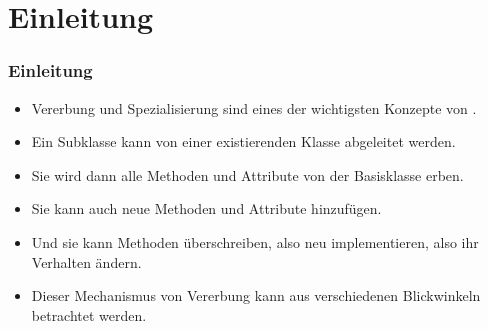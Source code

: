 \documentclass[aspectratio=169,mathserif,notheorems]{beamer}%
\subtitle{43.~Klassen:~Vererbung}%
\begin{document}
%
%
\startPresentation%
%
\section{Einleitung}%
\begin{frame}[t]%
\frametitle{Einleitung}%
\begin{itemize}%
%
\item Vererbung und Spezialisierung sind eines der wichtigsten Konzepte von .%
%
\item<2-> Ein Subklasse kann von einer existierenden Klasse abgeleitet werden.%
%
\item<3-> Sie wird dann alle Methoden und Attribute von der Basisklasse erben.%
%
\item<4-> Sie kann auch neue Methoden und Attribute hinzufügen.%
%
\item<5-> Und sie kann Methoden überschreiben, also neu implementieren, also ihr Verhalten ändern.%
%
\item<6-> Dieser Mechanismus von Vererbung kann aus verschiedenen Blickwinkeln betrachtet werden.%
\end{itemize}%
\end{frame}%
%
%
\end{document}
